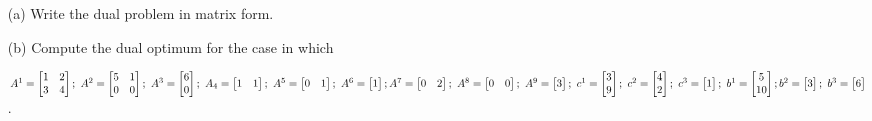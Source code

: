 \begin{itemize}
	\item[(a)] Write the dual problem in matrix form.
	
	\item[(b)] Compute the dual optimum for the case in which
	
	$
	A^1 = 
	\begin{bmatrix}
		1 & 2 \\
		3 & 4
	\end{bmatrix}  ; \ 
	A^2 = 
	\begin{bmatrix}
		5 & 1 \\
		0 & 0
	\end{bmatrix}  ; \ 
	A^3 = 
	\begin{bmatrix}
		6 \\
		0
	\end{bmatrix}  ; \ 
	A_4 = 
	\begin{bmatrix}
		1 & 1
	\end{bmatrix}  ; \ 
	A^5 = 
	\begin{bmatrix}
		0 & 1
	\end{bmatrix}  ; \ 
	A^6 = 
	\begin{bmatrix}
		1
	\end{bmatrix}  ; \\ 
	A^7 = 
	\begin{bmatrix}
		0 & 2
	\end{bmatrix}  ; \ 
	A^8 = 
	\begin{bmatrix}
		0 & 0
	\end{bmatrix}  ; \ 
	A^9 = 
	\begin{bmatrix}
		3
	\end{bmatrix}  ; \ 
	c^1 = 
	\begin{bmatrix}
		3 \\
		9
	\end{bmatrix}  ; \ 
	c^2 = 
	\begin{bmatrix}
		4 \\
		2
	\end{bmatrix}  ; \ 
	c^3 = 
	\begin{bmatrix}
		1
	\end{bmatrix}  ; \ 
	b^1 = 
	\begin{bmatrix}
		5 \\
		10
	\end{bmatrix}  ; \\ 
	b^2 = 
	\begin{bmatrix}
		3 
	\end{bmatrix}  ; \ 
	b^3 =
	\begin{bmatrix}
		6
	\end{bmatrix}
	$
	.
		
\end{itemize}
